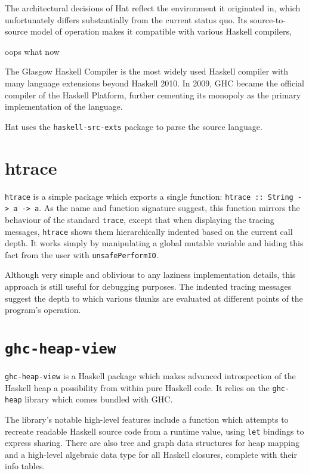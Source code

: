 \documentclass[thesis=B,english]{FITthesis}[2019/12/23]
\begin{document}
The architectural decisions of Hat reflect the environment it originated in,
which unfortunately differs substantially from the current status quo. Its
source-to-source model of operation makes it compatible with various Haskell
compilers, 

oops what now %

The Glasgow Haskell Compiler is the most widely used Haskell
compiler
with many language extensions beyond Haskell 2010. In 2009, GHC became the
official compiler of the Haskell Platform\cite{haskell-platform}, further
cementing its monopoly as the primary implementation of the language.

Hat uses the \texttt{haskell-src-exts} package to parse the source language.


\section{htrace}
\texttt{htrace} %
is a simple package which exports a single function: \texttt{htrace :: String
-> a -> a}. As the name and function signature suggest, this function mirrors
the behaviour of the standard \texttt{trace}, except that when displaying the
tracing messages, \texttt{htrace} shows them hierarchically indented based on
the current call depth. It works simply by manipulating a global mutable
variable and hiding this fact from the user with \texttt{unsafePerformIO}.

Although very simple and oblivious to any laziness implementation details, this
approach is still useful for debugging purposes. The indented tracing messages
suggest the depth to which various thunks are evaluated at different points of
the program's operation.

\section{\texttt{ghc-heap-view}}
\texttt{ghc-heap-view} is a Haskell package which makes advanced introspection
of the Haskell heap a possibility from within pure Haskell code. It relies on
the \texttt{ghc-heap} library which comes bundled with GHC.

The library's notable high-level features include a function which attempts to
recreate readable Haskell source code from a runtime value, using \texttt{let}
bindings to express sharing. There are also tree and graph data structures for
heap mapping and a high-level algebraic data type for all Haskell closures,
complete with their info tables.
\end{document}
